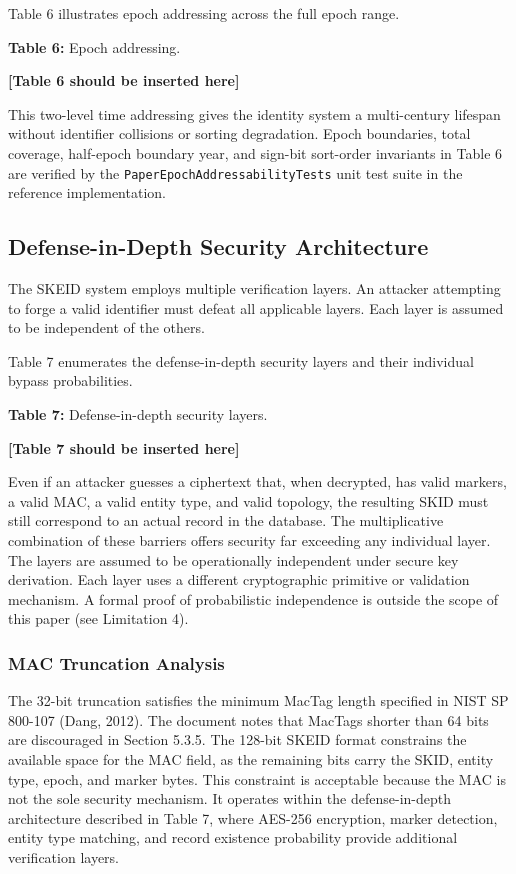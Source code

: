 \documentclass[fleqn,10pt,lineno]{wlpeerj}
\begin{document}
\newpage

Table 6 illustrates epoch addressing across the full epoch range.

\textbf{Table 6:} Epoch addressing.

\textbf{{[}Table 6 should be inserted here{]}}

This two-level time addressing gives the identity system a multi-century
lifespan without identifier collisions or sorting degradation. Epoch
boundaries, total coverage, half-epoch boundary year, and sign-bit
sort-order invariants in Table 6 are verified by the
\texttt{PaperEpochAddressabilityTests} unit test suite in the reference
implementation.

\subsection{Defense-in-Depth Security
Architecture}\label{defense-in-depth-security-architecture}

The SKEID system employs multiple verification layers. An attacker
attempting to forge a valid identifier must defeat all applicable
layers. Each layer is assumed to be independent of the others.

Table 7 enumerates the defense-in-depth security layers and their
individual bypass probabilities.

\textbf{Table 7:} Defense-in-depth security layers.

\textbf{{[}Table 7 should be inserted here{]}}

Even if an attacker guesses a ciphertext that, when decrypted, has valid
markers, a valid MAC, a valid entity type, and valid topology, the
resulting SKID must still correspond to an actual record in the
database. The multiplicative combination of these barriers offers
security far exceeding any individual layer. The layers are assumed to
be operationally independent under secure key derivation. Each layer
uses a different cryptographic primitive or validation mechanism. A
formal proof of probabilistic independence is outside the scope of this
paper (see Limitation 4).

\subsubsection{MAC Truncation Analysis}\label{mac-truncation-analysis}

The 32-bit truncation satisfies the minimum MacTag length specified in
NIST SP 800-107 (Dang, 2012). The document notes that MacTags shorter
than 64 bits are discouraged in Section 5.3.5. The 128-bit SKEID format
constrains the available space for the MAC field, as the remaining bits
carry the SKID, entity type, epoch, and marker bytes. This constraint is
acceptable because the MAC is not the sole security mechanism. It
operates within the defense-in-depth architecture described in Table 7,
where AES-256 encryption, marker detection, entity type matching, and
record existence probability provide additional verification layers.
\end{document}
